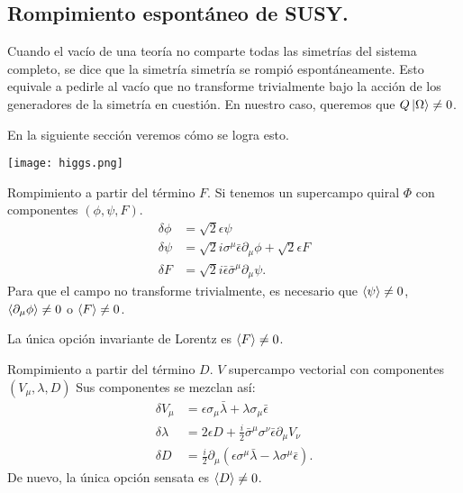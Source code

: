 \documentclass[10pt,a4paper]{beamer}
\begin{document}
\subsection{Rompimiento espontáneo de SUSY.}
\begin{frame}{\subsecname}
Cuando el vacío de una teoría no comparte todas las simetrías del sistema
completo, se dice que la simetría simetría se rompió espontáneamente. Esto
equivale a pedirle al vacío que no transforme trivialmente bajo la acción de los
generadores de la simetría en cuestión. En nuestro caso, queremos que $Q\ket{\Omega}\neq 0$.

En la siguiente sección veremos cómo se logra esto.
\begin{center}
\texttt{[image: higgs.png]}
\end{center}
\end{frame}

\begin{frame}{Rompimiento a partir del término $F$.}
Si tenemos un supercampo quiral $\Phi$ con componentes $(\phi,\psi,F)$.
\[
  \begin{aligned}
    \delta \phi &= \sqrt{2}\epsilon \psi\\
    \delta \psi &= \sqrt{2}i\sigma^\mu\bar\epsilon \partial_\mu\phi +
    \sqrt{2}\epsilon F\\
    \delta F    &= \sqrt{2}i\bar\epsilon\bar\sigma^\mu\partial_\mu \psi.
  \end{aligned}
\]
Para que el campo no transforme trivialmente, es necesario que
$\braket{\psi}\neq 0$, $\braket{\partial_\mu \phi}\neq 0$ o $\braket{F}\neq 0$.

La única opción invariante de Lorentz es $\braket{F}\neq 0$.
\end{frame}

\begin{frame}{Rompimiento a partir del término $D$.}
$V$ supercampo vectorial con componentes $(V_\mu,\lambda,D)$
Sus componentes se mezclan así:
\[
  \begin{aligned}
    \delta V_\mu &= \epsilon \sigma_\mu \bar\lambda +
    \lambda\sigma_\mu\bar\epsilon\\
    \delta \lambda &= {2}\epsilon D+
    \frac{i}{2}\bar\sigma^\mu\sigma^\nu\bar\epsilon \partial_\mu V_\nu\\
    \delta D    &= \frac{i}{2}\partial_\mu\left(\epsilon\sigma^\mu\bar\lambda -\lambda\sigma^\mu\bar\epsilon
  \right).
  \end{aligned}
\]
De nuevo, la única opción sensata es
$\braket{D}\neq 0$.
\end{frame}
\end{document}

